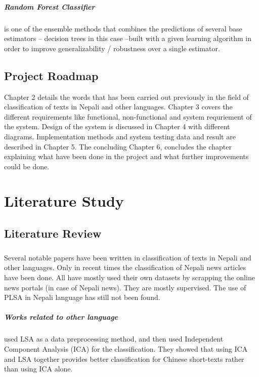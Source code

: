 \documentclass[12pt]{report}
\begin{document}
        \paragraph{Random Forest Classifier}

        is one of the ensemble methods that combines the predictions of several base estimators -- decision trees in this case --built with a given learning algorithm
        in order to improve generalizability / robustness over a single estimator.


        \section{Project Roadmap}
        Chapter 2 details the words that has been carried out previously in the field of classification of texts in Nepali and other languages.
        Chapter 3 covers the different requirements like functional, non-functional and system requriement of the system.
        Design of the system is discussed in Chapter 4 with different diagrams.
        Implementation methods and system testing data and result are described in Chapter 5.
        The concluding Chapter 6, concludes the chapter explaining what have been done in the project and what further improvements could be done.





    \chapter{Literature Study}

            \section{Literature Review}
                \paragraph{}
                    Several notable papers have been written in classification of texts in Nepali and other languages. Only in recent times the classification of Nepali news articles have been done.
                    All have mostly used their own datasets by scrapping the online news portals (in case of Nepali news). They are mostly supervised. The use of PLSA in Nepali language has still not been found.

                    \paragraph{Works related to other language}
                            \cite{pu2006short} used LSA as a data preprocessing method, and then used Independent Component Analysis (ICA) for the classification. They showed that
                            using ICA and LSA together provides better classification for Chinese short-texts rather than using ICA alone.
\end{document}
